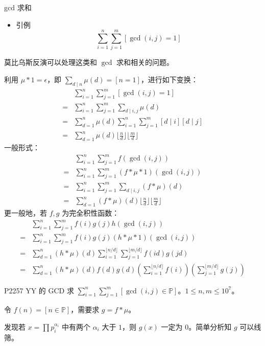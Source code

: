 \documentclass [hyperref={bookmarksdepth=4}, aspectratio=169] {beamer}
\theoremstyle {fy}
\def\P{\mathbb{P}}
\begin{document}
\begin{frame}{gcd 求和}
\begin{itemize}
    \item 引例
  $$
  \sum_{i=1}^n\sum_{j=1}^m[\gcd(i,j)=1]
  $$
\end{itemize}

莫比乌斯反演可以处理这类和 $\gcd$ 求和相关的问题。

利用 $\mu*1=\epsilon$，即 $\sum\limits_{d\mid n}\mu(d)=[n=1]$，进行如下变换：
$$
\begin{aligned}
&\sum_{i=1}^n\sum_{j=1}^m[\gcd(i,j)=1]\\
=&\sum_{i=1}^n\sum_{j=1}^m\sum_{d\mid i,j}\mu(d)\\
=&\sum_{d=1}^n\mu(d)\sum_{i=1}^n\sum_{j=1}^m[d\mid i][d\mid j]\\
=&\sum_{d=1}^n\mu(d)\lfloor\frac{n}{d}\rfloor\lfloor\frac{m}{d}\rfloor
\end{aligned}
$$
一般形式：
$$
\begin{aligned}
&\sum_{i=1}^n\sum_{j=1}^m f(\gcd(i,j))\\
=&\sum_{i=1}^n\sum_{j=1}^m(f*\mu*1)(\gcd(i,j))\\
=&\sum_{i=1}^n\sum_{j=1}^m\sum_{d\mid i,j}(f*\mu)(d)\\
=&\sum_{d=1}^n(f*\mu)(d)\lfloor\frac{n}{d}\rfloor\lfloor\frac{m}{d}\rfloor
\end{aligned}
$$
更一般地，若 $f,g$ 为完全积性函数：
$$
\begin{aligned}
&\sum_{i=1}^n\sum_{j=1}^mf(i)g(j)h(\gcd(i,j))\\
=&\sum_{i=1}^n\sum_{j=1}^mf(i)g(j)(h*\mu*1)(\gcd(i,j))\\
=&\sum_{d=1}^n(h*\mu)(d)\sum_{i=1}^{\lfloor n/d\rfloor}\sum_{j=1}^{\lfloor m/d\rfloor}f(id)g(jd)\\
=&\sum_{d=1}^n(h*\mu)(d)f(d)g(d)(\sum_{i=1}^{\lfloor n/d\rfloor}f(i))(\sum_{j=1}^{\lfloor m/d\rfloor}g(j))
\end{aligned}
$$
\end{frame}

\begin{frame}{P2257 YY 的 GCD}
求 $\sum\limits_{i=1}^n\sum\limits_{j=1}^m[\gcd(i,j)\in\P]$。$1\le n,m\le 10^7$。

令 $f(n)=[n\in \P]$，需要求 $g=f*\mu$。

发现若 $x=\prod\limits p_i^{\alpha_i}$ 中有两个 $\alpha_i$ 大于 $1$，则 $g(x)$ 一定为 $0$。简单分析知 $g$ 可以线筛。
\end{frame}
\end{document}
